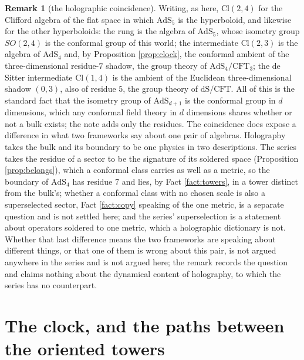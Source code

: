 \documentclass[11pt]{article}
\theoremstyle{definition}
\newtheorem{remark}[theorem]{Remark}
\newcommand{\Cl}{\mathrm{Cl}}
\begin{document}
\begin{remark}[the holographic coincidence]\label{rem:holography}
Writing, as here, $\Cl(2,4)$ for the Clifford algebra of the flat space in which $\mathrm{AdS}_{5}$ is the hyperboloid, and likewise for the other hyperboloids: the rung is the algebra of $\mathrm{AdS}_{5}$, whose isometry group $SO(2,4)$ is the conformal group of this world; the intermediate $\Cl(2,3)$ is the algebra of $\mathrm{AdS}_{4}$ and, by Proposition \ref{prop:clock}, the conformal ambient of the three-dimensional residue-$7$ shadow, the group theory of $\mathrm{AdS}_{4}/\mathrm{CFT}_{3}$; the de Sitter intermediate $\Cl(1,4)$ is the ambient of the Euclidean three-dimensional shadow $(0,3)$, also of residue $5$, the group theory of $\mathrm{dS}/\mathrm{CFT}$. All of this is the standard fact that the isometry group of $\mathrm{AdS}_{d+1}$ is the conformal group in $d$ dimensions, which any conformal field theory in $d$ dimensions shares whether or not a bulk exists; the note adds only the residues. The coincidence does expose a difference in what two frameworks say about one pair of algebras. Holography takes the bulk and its boundary to be one physics in two descriptions. The series takes the residue of a sector to be the signature of its soldered space (Proposition \ref{prop:belongs}), which a conformal class carries as well as a metric, so the boundary of $\mathrm{AdS}_{4}$ has residue $7$ and lies, by Fact \ref{fact:towers}, in a tower distinct from the bulk's; whether a conformal class with no chosen scale is also a superselected sector, Fact \ref{fact:copy} speaking of the one metric, is a separate question and is not settled here; and the series' superselection is a statement about operators soldered to one metric, which a holographic dictionary is not. Whether that last difference means the two frameworks are speaking about different things, or that one of them is wrong about this pair, is not argued anywhere in the series and is not argued here; the remark records the question and claims nothing about the dynamical content of holography, to which the series has no counterpart.
\end{remark}

\section{The clock, and the paths between the oriented towers}\label{sec:clock}
\end{document}
